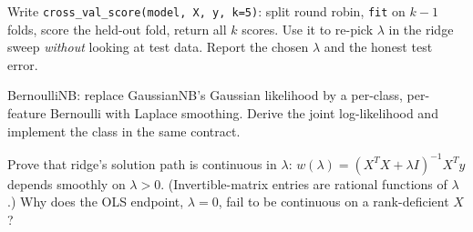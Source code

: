 \begin{exercise}[hard]
Write \texttt{cross\_val\_score(model, X, y, k=5)}: split round
robin, \texttt{fit} on $k{-}1$ folds, score the held-out fold,
return all $k$ scores. Use it to re-pick $\lambda$ in the ridge
sweep \emph{without} looking at test data. Report the chosen
$\lambda$ and the honest test error.
\end{exercise}

\begin{exercise}[hard]
BernoulliNB: replace GaussianNB's Gaussian likelihood by a per-class,
per-feature Bernoulli with Laplace smoothing. Derive the joint
log-likelihood and implement the class in the same contract.
\end{exercise}

\begin{exercise}[hard]
Prove that ridge's solution path is continuous in $\lambda$:
$w(\lambda)=(X^TX+\lambda I)^{-1}X^Ty$ depends smoothly on
$\lambda>0$. (Invertible-matrix entries are rational functions of
$\lambda$.) Why does the OLS endpoint, $\lambda=0$, fail to be
continuous on a rank-deficient $X$?
\end{exercise}
